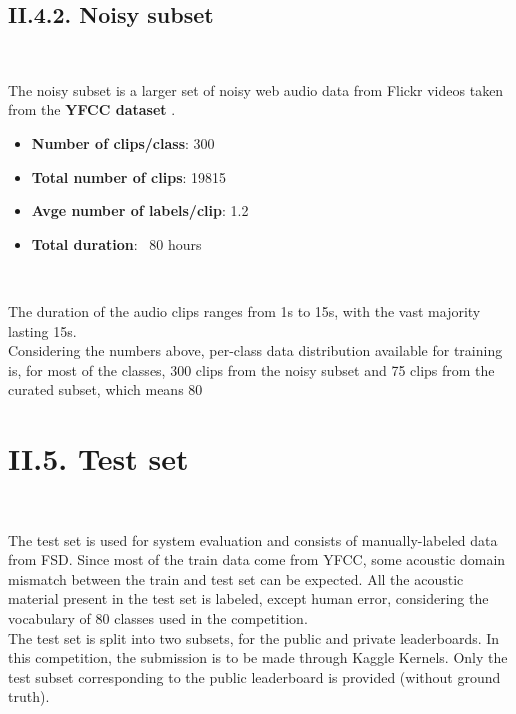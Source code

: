 \documentclass[11pt, a4papper]{report}
\theoremstyle{plain}
\theoremstyle{definition}
\theoremstyle{definition}
\theoremstyle{proposition}
\begin{document}
\subsection*{II.4.2. Noisy subset}
\

The noisy subset is a larger set of noisy web audio data from Flickr videos taken from the \textbf{YFCC dataset} \cite{6}.
\begin{itemize}
\item \textbf{Number of clips/class}: 300
\item \textbf{Total number of clips}: 19815
\item \textbf{Avge number of labels/clip}: 1.2
\item \textbf{Total duration}: ~80 hours
\end{itemize}
\

The duration of the audio clips ranges from 1s to 15s, with the vast majority lasting 15s.
\\

Considering the numbers above, per-class data distribution available for training is, for most of the classes, 300 clips from the noisy subset and 75 clips from the curated subset, which means 80%

\section*{II.5. Test set}
\

The test set is used for system evaluation and consists of manually-labeled data from FSD. Since most of the train data come from YFCC, some acoustic domain mismatch between the train and test set can be expected. All the acoustic material present in the test set is labeled, except human error, considering the vocabulary of 80 classes used in the competition.
\\

The test set is split into two subsets, for the public and private leaderboards. In this competition, the submission is to be made through Kaggle Kernels. Only the test subset corresponding to the public leaderboard is provided (without ground truth).
\end{document}
